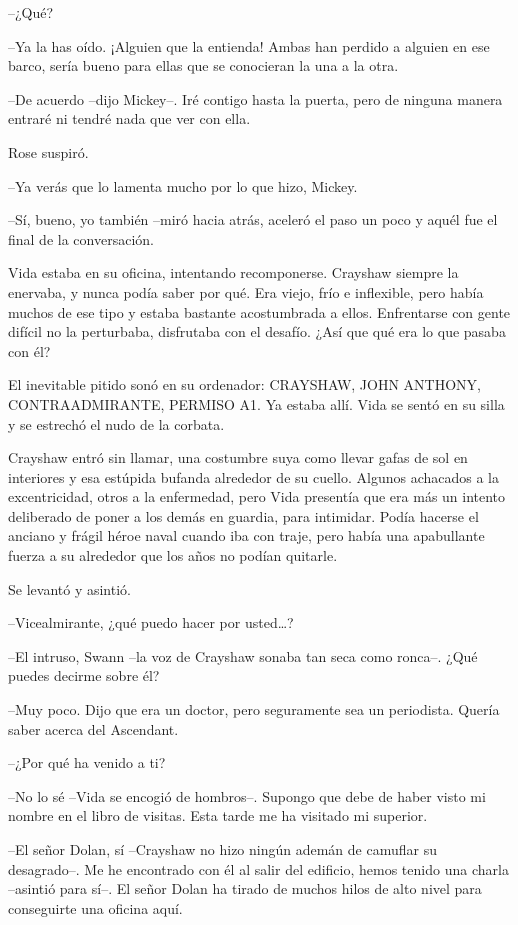 {--¿Qué?}

{--Ya la has oído. ¡Alguien que la entienda! Ambas han perdido a alguien
 en ese barco, sería bueno para ellas que se conocieran la una a la
otra.}

{--De acuerdo --dijo Mickey--. Iré contigo hasta la puerta, pero de
ninguna manera entraré ni tendré nada que ver con ella.}

{Rose suspiró.}

{--Ya verás que lo lamenta mucho por lo que hizo, Mickey.}

{--Sí, bueno, yo también --miró hacia atrás, aceleró el paso un poco y
aquél fue el final de la conversación.}

\mbox{}

{Vida estaba en su oficina, intentando recomponerse. Crayshaw siempre la
 enervaba, y nunca podía saber por qué. Era viejo, frío e inflexible,
 pero había muchos de ese tipo y estaba bastante acostumbrada a ellos.
 Enfrentarse con gente difícil no la perturbaba, disfrutaba con el
desafío. ¿Así que qué era lo que pasaba con él?}

{El inevitable pitido sonó en su ordenador: CRAYSHAW, JOHN ANTHONY,
 CONTRAADMIRANTE, PERMISO A1. Ya estaba allí. Vida se sentó en su silla y
se estrechó el nudo de la corbata.}

{Crayshaw entró sin llamar, una costumbre suya como llevar gafas de sol
 en interiores y esa estúpida bufanda alrededor de su cuello. Algunos
 achacados a la excentricidad, otros a la enfermedad, pero Vida presentía
 que era más un intento deliberado de poner a los demás en guardia, para
 intimidar. Podía hacerse el anciano y frágil héroe naval cuando iba con
 traje, pero había una apabullante fuerza a su alrededor que los años no
podían quitarle.}

{Se levantó y asintió.}

{--Vicealmirante, ¿qué puedo hacer por usted\ldots{}?}

{--El intruso, Swann --la voz de Crayshaw sonaba tan seca como ronca--.
¿Qué puedes decirme sobre él?}

{--Muy poco. Dijo que era un doctor, pero seguramente sea un periodista.
Quería saber acerca del Ascendant.}

{--¿Por qué ha venido a ti?}

{--No lo sé --Vida se encogió de hombros--. Supongo que debe de haber
 visto mi nombre en el libro de visitas. Esta tarde me ha visitado mi
superior.}

{--El señor Dolan, sí --Crayshaw no hizo ningún ademán de camuflar su
 desagrado--. Me he encontrado con él al salir del edificio, hemos tenido
 una charla --asintió para sí--. El señor Dolan ha tirado de muchos hilos
de alto nivel para conseguirte una oficina aquí.}

